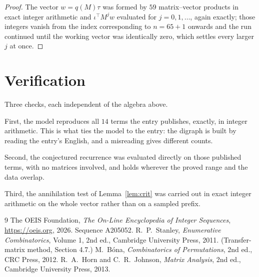\documentclass[11pt,a4paper]{article}
\theoremstyle{plain}
\theoremstyle{definition}
\begin{document}
\begin{proof}
The vector $w=q(M)\tau$ was formed by $59$ matrix--vector products in exact integer
arithmetic and $\iota^{\!\top}M^{j}w$ evaluated for $j=0,1,\dots$, again exactly; those
integers vanish from the index corresponding to $n=65+1$ onwards and the run continued
until the working vector was identically zero, which settles every larger $j$ at once.
\end{proof}

\section{Verification}

Three checks, each independent of the algebra above.

First, the model reproduces all $14$ terms the entry publishes, exactly, in integer
arithmetic. This is what ties the model to the entry: the digraph is built by reading the
entry's English, and a misreading gives different counts.

Second, the conjectured recurrence was evaluated directly on those published terms, with no
matrices involved, and holds wherever the proved range and the data overlap.

Third, the annihilation test of Lemma~\ref{lem:crit} was carried out in exact integer
arithmetic on the whole vector rather than on a sampled prefix.

\begin{thebibliography}{9}
 The OEIS Foundation, \emph{The On-Line Encyclopedia of Integer
Sequences}, \url{https://oeis.org}, 2026. Sequence A205052.
 R.~P.~Stanley, \emph{Enumerative Combinatorics}, Volume 1, 2nd ed.,
Cambridge University Press, 2011. (Transfer-matrix method, Section 4.7.)
 M.~B\'ona, \emph{Combinatorics of Permutations}, 2nd ed., CRC
Press, 2012.
 R.~A.~Horn and C.~R.~Johnson, \emph{Matrix Analysis}, 2nd ed., Cambridge
University Press, 2013.
\end{thebibliography}
\end{document}

